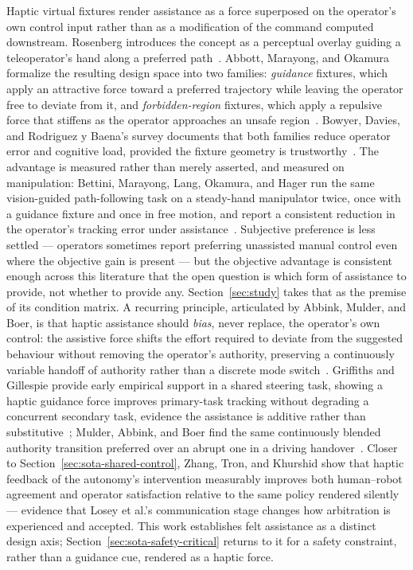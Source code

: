 \documentclass[12pt,a4paper,twoside,openright]{report}
\begin{document}
Haptic virtual fixtures render assistance as a force superposed on the operator's own control input rather than as a modification of the command computed downstream. Rosenberg introduces the concept as a perceptual overlay guiding a teleoperator's hand along a preferred path~\cite{rosenberg1993virtual}. Abbott, Marayong, and Okamura formalize the resulting design space into two families: \emph{guidance} fixtures, which apply an attractive force toward a preferred trajectory while leaving the operator free to deviate from it, and \emph{forbidden-region} fixtures, which apply a repulsive force that stiffens as the operator approaches an unsafe region~\cite{abbott2007haptic}. Bowyer, Davies, and Rodriguez y Baena's survey documents that both families reduce operator error and cognitive load, provided the fixture geometry is trustworthy~\cite{bowyer2014activeconstraints}. The advantage is measured rather than merely asserted, and measured on manipulation: Bettini, Marayong, Lang, Okamura, and Hager run the same vision-guided path-following task on a steady-hand manipulator twice, once with a guidance fixture and once in free motion, and report a consistent reduction in the operator's tracking error under assistance~\cite{bettini2004vision}. Subjective preference is less settled --- operators sometimes report preferring unassisted manual control even where the objective gain is present --- but the objective advantage is consistent enough across this literature that the open question is which form of assistance to provide, not whether to provide any. Section~\ref{sec:study} takes that as the premise of its condition matrix. A recurring principle, articulated by Abbink, Mulder, and Boer, is that haptic assistance should \emph{bias}, never replace, the operator's own control: the assistive force shifts the effort required to deviate from the suggested behaviour without removing the operator's authority, preserving a continuously variable handoff of authority rather than a discrete mode switch~\cite{abbink2012hapticshared}. Griffiths and Gillespie provide early empirical support in a shared steering task, showing a haptic guidance force improves primary-task tracking without degrading a concurrent secondary task, evidence the assistance is additive rather than substitutive~\cite{griffiths2005sharing}; Mulder, Abbink, and Boer find the same continuously blended authority transition preferred over an abrupt one in a driving handover~\cite{mulder2012sharingcontrol}. Closer to Section~\ref{sec:sota-shared-control}, Zhang, Tron, and Khurshid show that haptic feedback of the autonomy's intervention measurably improves both human--robot agreement and operator satisfaction relative to the same policy rendered silently~\cite{zhang2021hapticagreement} --- evidence that Losey et al.'s communication stage changes how arbitration is experienced and accepted. This work establishes felt assistance as a distinct design axis; Section~\ref{sec:sota-safety-critical} returns to it for a safety constraint, rather than a guidance cue, rendered as a haptic force.
\end{document}
